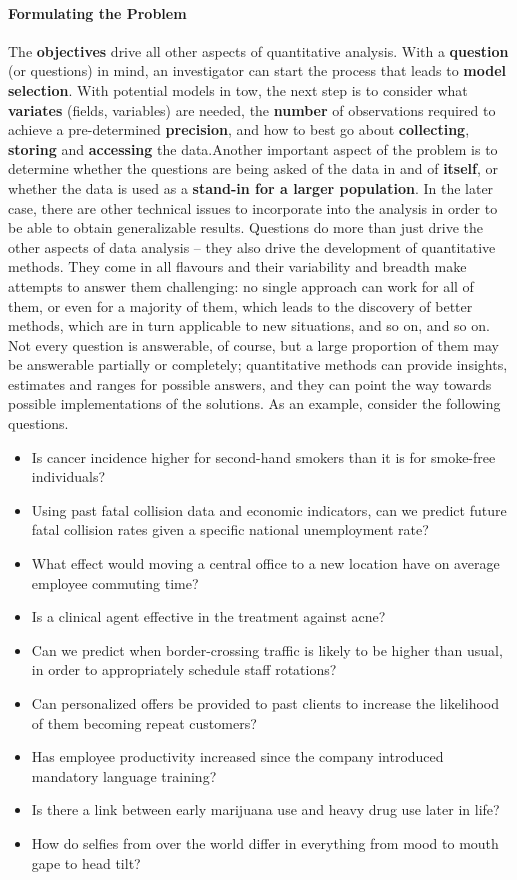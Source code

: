 \paragraph{Formulating the Problem} The \textbf{objectives} drive all other aspects of quantitative analysis. With a \textbf{question} (or questions) in mind, an investigator can start the process that leads to \textbf{model selection}. With potential models in tow, the next step is to consider what \textbf{variates} (fields, variables) are needed, the \textbf{number} of observations required to achieve a  pre-determined \textbf{precision}, and how to best go about \textbf{collecting}, \textbf{storing} and \textbf{accessing} the data.\newl Another important aspect of the problem is to determine whether the questions are being asked of the data in and of \textbf{itself}, or whether the data is used as a \textbf{stand-in for a larger population}. In the later case, there are other technical issues to incorporate into the analysis in order to be able to obtain generalizable results.  
\newl Questions do more than just drive the other aspects of data analysis -- they also drive the development of quantitative methods. They come in all flavours and their variability and breadth make attempts to answer them challenging: no single approach can work for all of them, or even for a majority of them, which leads to the discovery of better methods, which are in turn applicable to new situations, and so on, and so on.  
\newl 
Not every question is answerable, of course, but a large proportion of them may be answerable partially or completely; quantitative methods can provide insights, estimates and ranges for possible answers, and they can point the way towards possible implementations of the solutions.
\newl As an example, consider the following questions.
\begin{itemize}[noitemsep]
\item Is cancer incidence higher for second-hand smokers than it is for smoke-free individuals? 
\item Using past fatal collision data and economic indicators, can we predict future fatal collision rates given a specific national unemployment rate?   
\item What effect would moving a central office to a new location have on average employee commuting time?  
\item Is a clinical agent effective in the treatment against acne?
\item Can we predict when border-crossing traffic is likely to be higher than usual, in order to appropriately schedule staff rotations? 
\item Can personalized offers be provided to past clients to increase the likelihood of them becoming repeat customers? 
\item Has employee productivity increased since the company introduced mandatory language training?   
\item Is there a link between early marijuana use and heavy drug use later in life? 
\item How do selfies from over the world differ in everything from mood to mouth gape to head tilt?
\end{itemize}
